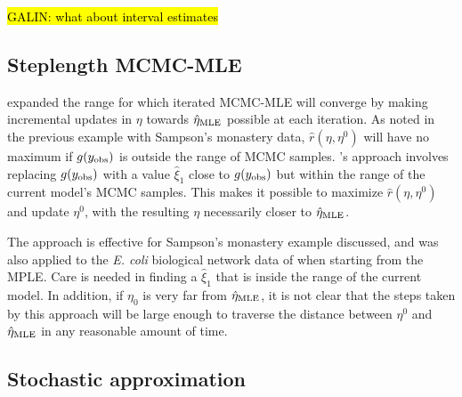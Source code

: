 \hl{GALIN: what about interval estimates}

\subsection{Steplength MCMC-MLE} \label{S:Hummel}
\citet{Hummel} expanded the range for which iterated MCMC-MLE will converge by
making incremental updates in $\eta$ towards $\hat{\eta}_{\textrm{MLE}}$ possible at each iteration.  
As noted in the 
previous example with 
Sampson's monastery data, $\hat{r}(\eta,\eta^0)$ 
will have no maximum if $g(y_{\text{obs}})$ is outside the range of MCMC samples.  
\citeauthor{Hummel}'s approach involves 
replacing $g(y_{\text{obs}})$ with a value $\hat{\xi}_1$ close to $g(y_{\text{obs}})$ but within
the range of the current model's MCMC samples.
This makes it possible to maximize $\hat{r}(\eta,\eta^0)$ and update $\eta^0$,
with the resulting $\eta$ necessarily closer to $\hat{\eta}_{\textrm{MLE}}$.

The approach is effective for Sampson's monastery example discussed, and was also applied
to the \emph{E. coli} biological network data of \citet{Shen-Orr} when 
starting from the MPLE.  Care is needed in finding a $\hat{\xi}_1$ that is inside
the range of the current model. In addition, if $\eta_0$ is very far from $\hat{\eta}_{\textrm{MLE}}$, it is 
not clear that the steps taken by this approach will be large enough to traverse
the distance between $\eta^0$ and $\hat{\eta}_{\textrm{MLE}}$ in any reasonable amount of time.



%

    
\subsection{Stochastic approximation}

